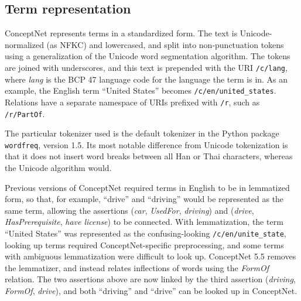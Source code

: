 \documentclass[letterpaper]{article}
\begin{document}
\subsection{Term representation}\label{term-representation}

ConceptNet represents terms in a standardized form. The text is
Unicode-normalized (as NFKC) and lowercased, and split into
non-punctuation tokens using a generalization of the Unicode word
segmentation algorithm. The tokens are joined with underscores, and this
text is prepended with the URI \texttt{/c/lang}, where \emph{lang} is
the BCP 47 language code for the language the term is in. As an example,
the English term ``United States'' becomes
\texttt{/c/en/united\_states}. Relations have a separate namespace of
URIs prefixed with \texttt{/r}, such as \texttt{/r/PartOf}.

The particular tokenizer used is the default tokenizer in the Python
package \texttt{wordfreq}, version 1.5. Its most notable difference from
Unicode tokenization is that it does not insert word breaks between all
Han or Thai characters, whereas the Unicode algorithm would.


Previous versions of ConceptNet required terms in English to be in lemmatized
form, so that, for example, ``drive'' and ``driving'' would be represented as
the same term, allowing the assertions (\emph{car}, \emph{UsedFor},
\emph{driving}) and (\emph{drive}, \emph{HasPrerequisite}, \emph{have license})
to be connected. With lemmatization, the term ``United States'' was represented
as the confusing-looking \texttt{/c/en/unite\_state}, looking up terms required
ConceptNet-specific preprocessing, and some terms with ambiguous lemmatization
were difficult to look up. ConceptNet 5.5 removes the lemmatizer, and instead
relates inflections of words using the \emph{FormOf} relation. The two
assertions above are now linked by the third assertion (\emph{driving},
\emph{FormOf}, \emph{drive}), and both ``driving'' and ``drive'' can be looked
up in ConceptNet.
\end{document}
